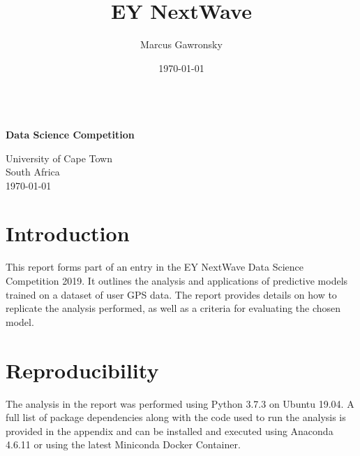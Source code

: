 \documentclass[12pt]{report}
\title{EY NextWave}								%
\author{Marcus Gawronsky}
\date{\today}											%
\makeatletter
\let\thetitle\@title
\let\theauthor\@author
\makeatother
\begin{document}

\begin{titlepage}

   \begin{center}
       \vspace*{5cm}
 
       \textbf{\Huge \thetitle}\\
       \vspace{0.75cm}
        \textbf{\Huge Data Science Competition}
 
       \vspace{1.5cm}
 
       \textbf{\theauthor}

 
       \vspace{0.8cm}
  
       University of Cape Town\\
       South Africa\\
       \today
 
   \end{center}
\end{titlepage}


\pagebreak

\section{Introduction}
This report forms part of an entry in the EY NextWave Data Science Competition 2019.  It outlines the analysis and applications of predictive models trained on a dataset of user GPS data. The report provides details on how to replicate the analysis performed, as well as a criteria for evaluating the chosen model.  
  
\section{Reproducibility}
The analysis in the report was performed using Python 3.7.3 on Ubuntu 19.04. A full list of package dependencies along with the code used to run the analysis is provided in the appendix and can be installed and executed using Anaconda 4.6.11 or using the latest Miniconda Docker Container.  \\
\\
\end{document}
